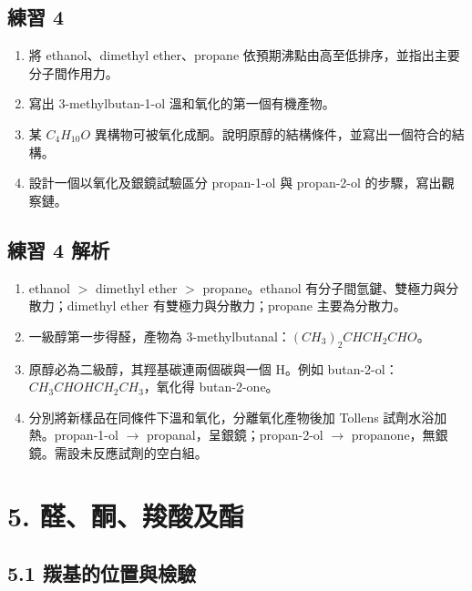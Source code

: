 \documentclass[11pt,a4paper]{article}
\newcounter{none}
\providecommand{\tightlist}{%
  \setlength{\itemsep}{0pt}\setlength{\parskip}{0pt}}
\begin{document}
\subsection{練習 4}\label{ux7df4ux7fd2-4}

\begin{enumerate}
\def\labelenumi{\arabic{enumi}.}
\tightlist
\item
  將 ethanol、dimethyl ether、propane 依預期沸點由高至低排序，並指出主要分子間作用力。
\item
  寫出 3-methylbutan-1-ol 溫和氧化的第一個有機產物。
\item
  某 \(C_4H_{10}O\) 異構物可被氧化成酮。說明原醇的結構條件，並寫出一個符合的結構。
\item
  設計一個以氧化及銀鏡試驗區分 propan-1-ol 與 propan-2-ol 的步驟，寫出觀察鏈。
\end{enumerate}

\subsection{練習 4 解析}\label{ux7df4ux7fd2-4-ux89e3ux6790}

\begin{enumerate}
\def\labelenumi{\arabic{enumi}.}
\tightlist
\item
  ethanol \(>\) dimethyl ether \(>\) propane。ethanol 有分子間氫鍵、雙極力與分散力；dimethyl ether 有雙極力與分散力；propane 主要為分散力。
\item
  一級醇第一步得醛，產物為 3-methylbutanal：\((CH_3)_2CHCH_2CHO\)。
\item
  原醇必為二級醇，其羥基碳連兩個碳與一個 H。例如 butan-2-ol：\(CH_3CHOHCH_2CH_3\)，氧化得 butan-2-one。
\item
  分別將新樣品在同條件下溫和氧化，分離氧化產物後加 Tollens 試劑水浴加熱。propan-1-ol \(\rightarrow\) propanal，呈銀鏡；propan-2-ol \(\rightarrow\) propanone，無銀鏡。需設未反應試劑的空白組。
\end{enumerate}

\section{5. 醛、酮、羧酸及酯}\label{ux919bux916eux7fa7ux9178ux53caux916f}

\subsection{5.1 羰基的位置與檢驗}\label{ux7fb0ux57faux7684ux4f4dux7f6eux8207ux6aa2ux9a57}
\end{document}
